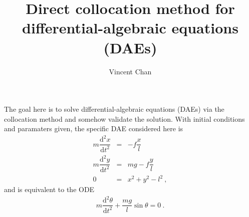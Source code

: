 \documentclass[11pt]{amsdtx}
\title{Direct collocation method for differential-algebraic equations (DAEs)}
\author{Vincent Chan}
\date{}
\newcommand{\ud}{\mathrm{d}}
\begin{document}
\maketitle

The goal here is to solve differential-algebraic equations (DAEs) via the collocation method and somehow validate the solution.  With initial conditions and paramaters given, the specific DAE considered here is
\begin{eqnarray*}
	m \dfrac{\ud^2 x}{\ud t^2} &=& -f\dfrac{x}{l} \\
	m \dfrac{\ud^2 y}{\ud t^2} &=& mg - f\dfrac{y}{l} \\
	0 &=& x^2 + y^2 - l^2 ~,
\end{eqnarray*}
and is equivalent to the ODE
\begin{eqnarray*}
	m \dfrac{\ud^2 \theta }{\ud t^2} + \dfrac{m g}{l} \sin \theta = 0~.
\end{eqnarray*}
\end{document}
